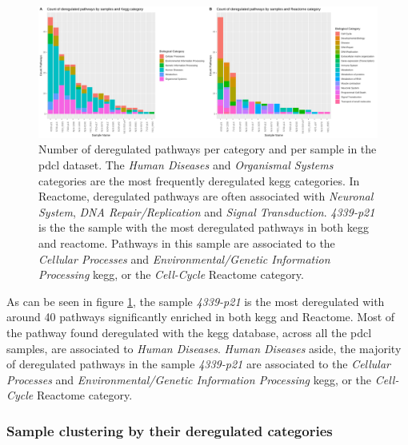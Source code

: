 \begin{figure}
    \includegraphics[width=\textwidth]{img/barplot-categ-pdcl}
    \caption{
        Number of deregulated pathways per category and per sample in the \acrshort{pdcl} dataset.
        The  \textit{Human Diseases} and \textit{Organismal Systems} categories are the most frequently deregulated \acrshort{kegg} categories.
        In Reactome, deregulated pathways are often associated with \textit{Neuronal System}, \textit{DNA Repair/Replication} and \textit{Signal Transduction}.
        \textit{4339-p21} is the the sample with the most deregulated pathways in both \acrshort{kegg} and reactome.
        Pathways in this sample are associated to the \textit{Cellular Processes} and \textit{Environmental/Genetic Information Processing} \acrshort{kegg}, or the \textit{Cell-Cycle} Reactome category.
    }
    \label{fig:barplot-categ-pdcl}
\end{figure}

As can be seen in figure \ref*{fig:barplot-categ-pdcl}, the sample \textit{4339-p21} is the most deregulated with around 40 pathways significantly enriched in both \acrshort{kegg} and Reactome.
Most of the pathway found deregulated with the \acrshort{kegg} database, across all the \acrshort{pdcl} samples, are associated to \textit{Human Diseases}.
\textit{Human Diseases} aside, the majority of deregulated pathways in the sample \textit{4339-p21} are associated to the \textit{Cellular Processes} and \textit{Environmental/Genetic Information Processing} \acrshort{kegg}, or the \textit{Cell-Cycle} Reactome category.

\subsubsection{Sample clustering by their deregulated categories}

